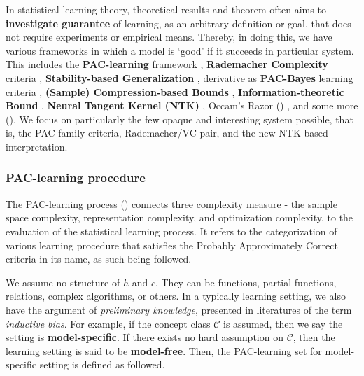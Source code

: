 \documentclass{article}
\begin{document}
In statistical learning theory, theoretical results and theorem often aims to \textbf{investigate guarantee} of learning, as an arbitrary definition or goal, that does not require experiments or empirical means. Thereby, in doing this, we have various frameworks in which a model is `good' if it succeeds in particular system. This includes the \textbf{PAC-learning} framework \cite{10.1145/1968.1972,VapnikChervonenkis:1971}, \textbf{Rademacher Complexity} criteria \cite{BartlettMendelson:2002:Rademacher,BartlettBousquetMendelson:2005:LocalRademacher}, \textbf{Stability-based Generalization} \cite{BousquetElisseeff:2002:Stability}, derivative as \textbf{PAC-Bayes} learning criteria \cite{McAllester:1999:PACBayes}, \textbf{(Sample) Compression-based Bounds} \cite{FloydWarmuth:1995:SampleCompression}, \textbf{Information-theoretic Bound} \cite{RussoZou:2016:InformationTheory,XuRaginsky:2017:InfoGen}, \textbf{Neural Tangent Kernel (NTK)} \cite{Jacot:2018:NTK}, Occam's Razor (\cite{10.5555/200548}) , and some more (\cite{Bartlett:1998:MarginComplexity,XuMannor:2010:RobustnessGeneralization,LittlestoneWarmuth:1994:WeightedMajority}). We focus on particularly the few opaque and interesting system possible, that is, the PAC-family criteria, Rademacher/VC pair, and the new NTK-based interpretation. 

\subsubsection{PAC-learning procedure}

The PAC-learning process (\cite{10.5555/2621980,10.5555/2371238,STL_Hajek_Maxim_2021}) connects three complexity measure - the sample space complexity, representation complexity, and optimization complexity, to the evaluation of the statistical learning process. It refers to the categorization of various learning procedure that satisfies the Probably Approximately Correct criteria in its name, as such being followed. 

We assume no structure of $h$ and $c$. They can be functions, partial functions, relations, complex algorithms, or others. In a typically learning setting, we also have the argument of \textit{preliminary knowledge}, presented in literatures of the term \textit{inductive bias}. For example, if the concept class $\mathcal{C}$ is assumed, then we say the setting is \textbf{model-specific}. If there exists no hard assumption on $\mathcal{C}$, then the learning setting is said to be \textbf{model-free}. Then, the PAC-learning set for model-specific setting is defined as followed. 
\end{document}
